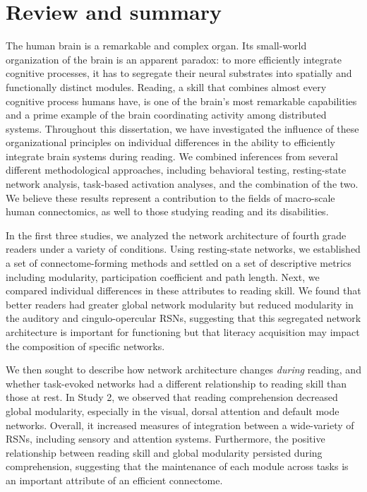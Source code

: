 \chapter{Review and summary}

The human brain is a remarkable and complex organ. Its small-world organization of the brain is an apparent paradox: to more efficiently integrate cognitive processes, it has to segregate their neural substrates into spatially and functionally distinct modules. Reading, a skill that combines almost every cognitive process humans have, is one of the brain's most remarkable capabilities and a prime example of the brain coordinating activity among distributed systems. Throughout this dissertation, we have investigated the influence of these organizational principles on individual differences in the ability to efficiently integrate brain systems during reading. We combined inferences from several different methodological approaches, including behavioral testing, resting-state network analysis, task-based activation analyses, and the combination of the two. We believe these results represent a contribution to the fields of macro-scale human connectomics, as well to those studying reading and its disabilities.

In the first three studies, we analyzed the network architecture of fourth grade readers under a variety of conditions. Using resting-state networks, we established a set of connectome-forming methods and settled on a set of descriptive metrics including modularity, participation coefficient and path length. Next, we compared individual differences in these attributes to reading skill. We found that better readers had greater global network modularity but reduced modularity in the auditory and cingulo-opercular RSNs, suggesting that this segregated network architecture is important for functioning but that literacy acquisition may impact the composition of specific networks. 

We then sought to describe how network architecture changes \textit{during} reading, and whether task-evoked networks had a different relationship to reading skill than those at rest. In Study 2, we observed that reading comprehension decreased global modularity, especially in the visual, dorsal attention and default mode networks. Overall, it increased measures of integration between a wide-variety of RSNs, including sensory and attention systems. Furthermore, the positive relationship between reading skill and global modularity persisted during comprehension, suggesting that the maintenance of each module across tasks is an important attribute of an efficient connectome. 

